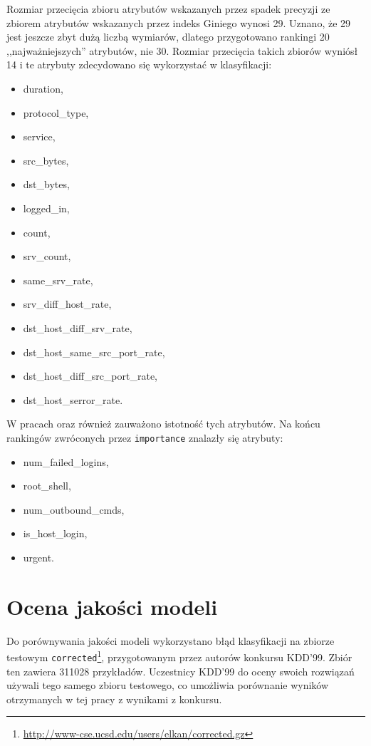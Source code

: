 \documentclass[a4paper, 12pt]{article}
\begin{document}
Rozmiar przecięcia zbioru atrybutów wskazanych przez spadek precyzji ze zbiorem
atrybutów wskazanych przez indeks Giniego wynosi 29. Uznano, że 29 jest jeszcze zbyt dużą liczbą
wymiarów, dlatego przygotowano rankingi 20 ,,najważniejszych'' atrybutów, nie 30.
Rozmiar przecięcia takich zbiorów wyniósł 14 i te atrybuty zdecydowano się wykorzystać 
w klasyfikacji: 
\begin{itemize}
	\item duration, 
	\item protocol\_type,
	\item service, 
	\item src\_bytes,
	\item dst\_bytes,
	\item logged\_in,
	\item count, 
	\item srv\_count,
	\item same\_srv\_rate, 
	\item srv\_diff\_host\_rate, 
	\item dst\_host\_diff\_srv\_rate, 
	\item dst\_host\_same\_src\_port\_rate,
	\item dst\_host\_diff\_src\_port\_rate, 
	\item dst\_host\_serror\_rate.
\end{itemize}
W pracach \cite{heywood} oraz \cite{oladele} również zauważono istotność tych atrybutów.
Na końcu rankingów zwróconych przez \texttt{importance} znalazły się atrybuty:
\begin{itemize}
	\item num\_failed\_logins,
	\item root\_shell,
	\item num\_outbound\_cmds,
	\item is\_host\_login,
	\item urgent.
\end{itemize}   

\section{Ocena jakości modeli}

Do porównywania jakości modeli wykorzystano błąd klasyfikacji na zbiorze testowym 
\texttt{corrected}\footnote{\url{http://www-cse.ucsd.edu/users/elkan/corrected.gz}},
przygotowanym przez autorów konkursu KDD'99.
Zbiór ten zawiera 311028 przykładów. 
Uczestnicy KDD'99 do oceny swoich rozwiązań używali tego samego zbioru testowego,
co umożliwia porównanie wyników otrzymanych w tej pracy z wynikami z konkursu.
\end{document}
